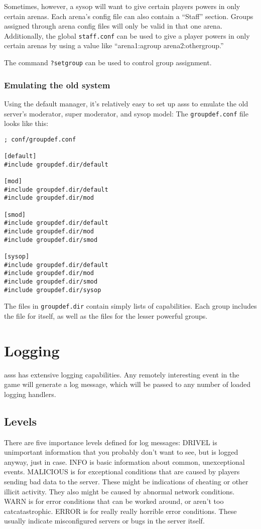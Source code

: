 \documentclass{article}
\newcommand{\asss}{asss}
\begin{document}
Sometimes, however, a sysop will want to give certain players powers in
only certain arenas. Each arena's config file can also contain a
``Staff'' section. Groups assigned through arena config files will only
be valid in that one arena. Additionally, the global \verb/staff.conf/
can be used to give a player powers in only certain arenas by using a
value like ``arena1:agroup arena2:othergroup.''

The command \verb/?setgroup/ can be used to control group assignment.

\subsubsection{Emulating the old system}
Using the default manager, it's relatively easy to set up \asss{} to
emulate the old server's moderator, super moderator, and sysop model:
The \verb/groupdef.conf/ file looks like this:

\begin{verbatim}
; conf/groupdef.conf

[default]
#include groupdef.dir/default

[mod]
#include groupdef.dir/default
#include groupdef.dir/mod

[smod]
#include groupdef.dir/default
#include groupdef.dir/mod
#include groupdef.dir/smod

[sysop]
#include groupdef.dir/default
#include groupdef.dir/mod
#include groupdef.dir/smod
#include groupdef.dir/sysop
\end{verbatim}

The files in \verb/groupdef.dir/ contain simply lists of capabilities.
Each group includes the file for itself, as well as the files for the
lesser powerful groups.


\section{Logging}

\asss{} has extensive logging capabilities. Any remotely interesting
event in the game will generate a log message, which will be passed to
any number of loaded logging handlers.

\subsection{Levels}

There are five importance levels defined for log messages: DRIVEL is
unimportant information that you probably don't want to see, but is
logged anyway, just in case. INFO is basic information about common,
unexceptional events. MALICIOUS is for exceptional conditions that are
caused by players sending bad data to the server. These might be
indications of cheating or other illicit activity. They also might be
caused by abnormal network conditions. WARN is for error conditions that
can be worked around, or aren't too catcatastrophic. ERROR is for really
really horrible error conditions. These usually indicate misconfigured
servers or bugs in the server itself.
\end{document}
